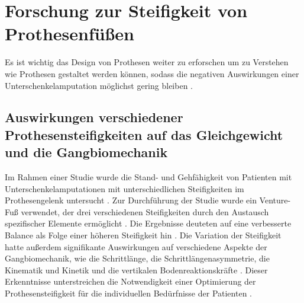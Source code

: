 \section{Forschung zur Steifigkeit von Prothesenfüßen}
Es ist wichtig das Design von Prothesen weiter zu erforschen um zu Verstehen wie Prothesen gestaltet werden können, sodass die negativen Auswirkungen einer Unterschenkelamputation möglichst gering bleiben \cite{Major.2014}.

\subsection{Auswirkungen verschiedener Prothesensteifigkeiten auf das Gleichgewicht und die Gangbiomechanik}
Im Rahmen einer Studie wurde die Stand- und Gehfähigkeit von Patienten mit Unterschenkelamputationen mit unterschiedlichen Steifigkeiten im Prothesengelenk untersucht \cite{Vaca.2022}. Zur Durchführung der Studie wurde ein Venture-Fuß verwendet, der drei verschiedenen Steifigkeiten durch den Austausch spezifischer Elemente ermöglicht \cite{Vaca.2022}. Die Ergebnisse deuteten auf eine verbesserte Balance als Folge einer höheren Steifigkeit hin \cite{Vaca.2022}. Die Variation der Steifigkeit hatte außerdem signifikante Auswirkungen auf verschiedene Aspekte der Gangbiomechanik, wie die Schrittlänge, die Schrittlängenasymmetrie, die Kinematik und Kinetik und die vertikalen Bodenreaktionskräfte \cite{Vaca.2022}. Dieser Erkenntnisse unterstreichen die Notwendigkeit einer Optimierung der Prothesensteifigkeit für die individuellen Bedürfnisse der Patienten \cite{Vaca.2022}.


